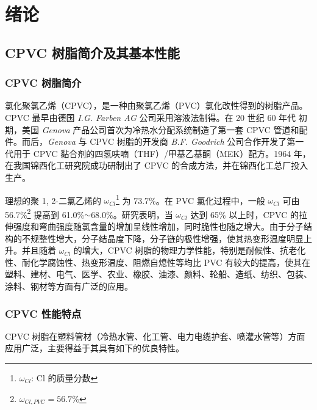 \chapter{绪论}

\section{CPVC 树脂简介及其基本性能}

\subsection{CPVC 树脂简介}
氯化聚氯乙烯（CPVC），是一种由聚氯乙烯（PVC）氯化改性得到的树脂产品。CPVC 最早由德国 \textit{I.G. Farben AG} 公司采用溶液法制得。在 20 世纪 60 年代 初期，美国 \textit{Genova} 产品公司首次为冷热水分配系统制造了第一套 CPVC 管道和配件。而后，\textit{Genova} 与 CPVC 树脂的开发商 \textit{B.F. Goodrich} 公司合作开发了第一代用于 CPVC 黏合剂的四氢呋喃（THF）/甲基乙基酮（MEK）配方。1964 年，在我国锦西化工研究院成功研制出了 CPVC 的合成方法，并在锦西化工总厂投入生产。\par
理想的聚 1, 2-二氯乙烯的 $\omega_{Cl}$\footnote{$\omega_{Cl}$: Cl 的质量分数} 为 73.7\%。在 PVC 氯化过程中，一般 $\omega_{Cl}$ 可由 56.7\%\footnote{$\omega_{Cl, PVC} = 56.7\%$} 提高到 61.0\%$\sim$68.0\%。研究表明，当 $\omega_{Cl}$ 达到 65\% 以上时，CPVC 的拉伸强度和弯曲强度随氯含量的增加呈线性增加，同时脆性也随之增大。由于分子结构的不规整性增大，分子结晶度下降，分子链的极性增强，使其热变形温度明显上升\cite{14}。并且随着 $\omega_{Cl}$ 的增大，CPVC 树脂的物理力学性能，特别是耐候性、抗老化性、耐化学腐蚀性、热变形温度、阻燃自熄性等均比 PVC 有较大的提高，使其在塑料、建材、电气、医学、农业、橡胶、油漆、颜料、轮船、造纸、纺织、包装、涂料、钢材等方面有广泛的应用\cite{19}。

\subsection{CPVC 性能特点}
CPVC 树脂在塑料管材（冷热水管、化工管、电力电缆护套、喷灌水管等）方面应用广泛，主要得益于其具有如下的优良特性。

